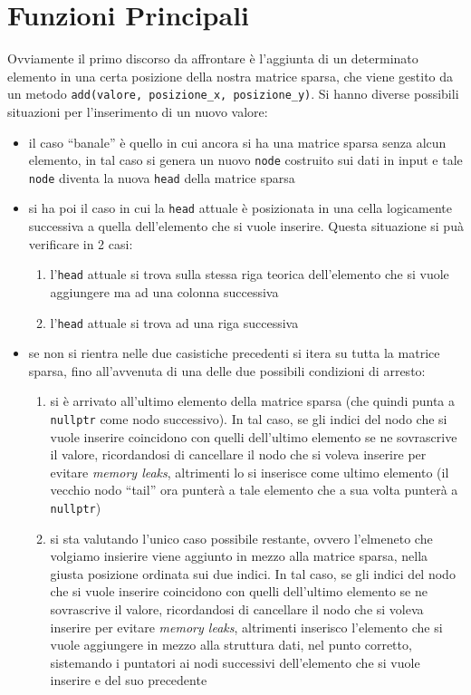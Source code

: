 \documentclass[a4paper,12pt, oneside]{article}
\begin{document}
\section*{Funzioni Principali}
Ovviamente il primo discorso da affrontare è l'aggiunta di un
determinato elemento in una certa posizione della nostra matrice
sparsa, che viene gestito da un metodo \texttt{add(valore,
  posizione\_x, posizione\_y)}. Si hanno diverse possibili situazioni
per l'inserimento di un nuovo valore:
\begin{itemize}
  \item il caso ``banale'' è quello in cui ancora si ha una matrice
  sparsa senza alcun elemento, in tal caso si genera un nuovo
  \texttt{node} costruito sui dati in input e tale \texttt{node}
  diventa la nuova \texttt{head} della matrice sparsa
  \item si ha poi il caso in cui la \texttt{head} attuale è
  posizionata in una cella logicamente successiva a quella
  dell'elemento che si vuole inserire. Questa situazione si puà
  verificare in 2 casi:
  \begin{enumerate}
    \item l'\texttt{head} attuale si trova sulla stessa riga teorica
    dell'elemento che si vuole aggiungere ma ad una colonna successiva
    \item l'\texttt{head} attuale si trova ad una riga successiva
  \end{enumerate}
  \item se non si rientra nelle due casistiche precedenti si itera su
  tutta la matrice sparsa, fino all'avvenuta di una delle due
  possibili condizioni di arresto:
  \begin{enumerate}
    \item si è arrivato all'ultimo elemento della matrice sparsa (che
    quindi punta a \texttt{nullptr} come nodo successivo). In tal
    caso, se gli indici del nodo che si vuole inserire coincidono con
    quelli dell'ultimo elemento se ne sovrascrive il valore,
    ricordandosi di cancellare il nodo che si voleva inserire per
    evitare \textit{memory leaks}, altrimenti lo si inserisce come
    ultimo elemento (il vecchio nodo ``tail'' ora punterà a tale
    elemento che a sua volta punterà a \texttt{nullptr})
    \item si sta valutando l'unico caso possibile restante, ovvero
    l'elmeneto che volgiamo insierire viene aggiunto in mezzo alla
    matrice sparsa, nella giusta posizione ordinata sui due indici. In
    tal caso, se gli indici del nodo che si vuole inserire coincidono
    con quelli dell'ultimo elemento se ne sovrascrive il valore,
    ricordandosi di cancellare il nodo che si voleva inserire per
    evitare \textit{memory leaks}, altrimenti inserisco l'elemento che
    si vuole aggiungere in mezzo alla struttura dati, nel punto
    corretto, sistemando i puntatori ai nodi successivi dell'elemento
    che si vuole inserire e del suo precedente
  \end{enumerate}
\end{itemize}
\end{document}
